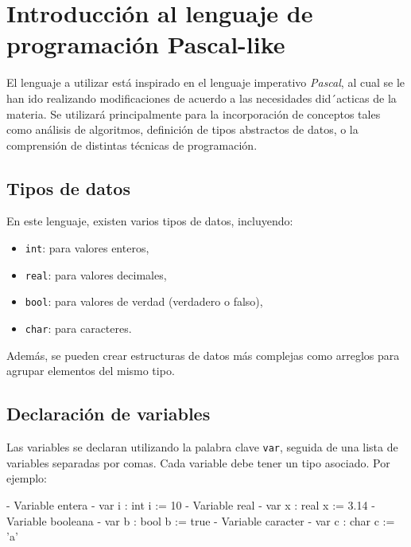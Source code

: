 \section{Introducción al lenguaje de programación Pascal-like}

El lenguaje a utilizar está inspirado en el lenguaje imperativo \textit{Pascal}, al cual se le han ido realizando modificaciones de acuerdo a las necesidades did´acticas de la
materia. Se utilizará principalmente para la incorporación de conceptos tales como análisis de algoritmos, definición de tipos abstractos de datos, o la comprensión de distintas técnicas de programación. 

\subsection{Tipos de datos}
En este lenguaje, existen varios tipos de datos, incluyendo:
\begin{itemize}
    \item \texttt{int}: para valores enteros,
    \item \texttt{real}: para valores decimales,
    \item \texttt{bool}: para valores de verdad (verdadero o falso),
    \item \texttt{char}: para caracteres.
\end{itemize}
Además, se pueden crear estructuras de datos más complejas como arreglos para agrupar elementos del mismo tipo.

\subsection{Declaración de variables}
Las variables se declaran utilizando la palabra clave \texttt{var}, seguida de una lista de variables separadas por comas. Cada variable debe tener un tipo asociado. Por ejemplo:
\begin{pascallike}
    {- Variable entera -}
    var i : int
    i := 10
    {- Variable real -}
    var x : real
    x := 3.14
    {- Variable booleana -}
    var b : bool
    b := true
    {- Variable caracter -}
    var c : char
    c := 'a'
\end{pascallike}

